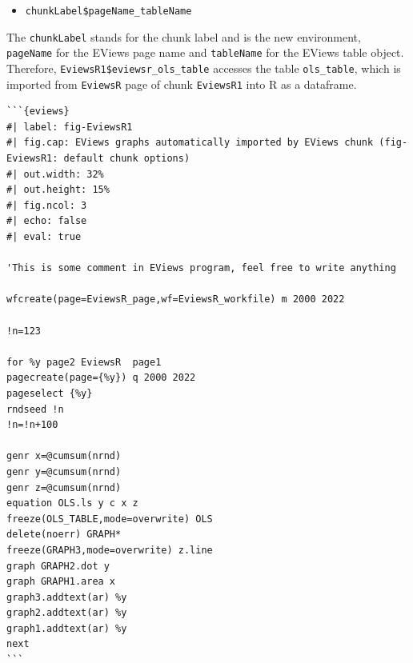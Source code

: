 \begin{itemize}
\tightlist
\item
  \texttt{chunkLabel\$pageName\_tableName}
\end{itemize}

The \texttt{chunkLabel} stands for the chunk label and is the new environment, \texttt{pageName} for the EViews page name and \texttt{tableName} for the EViews table object. Therefore, \texttt{EviewsR1\$eviewsr\_ols\_table} accesses the table \texttt{ols\_table}, which is imported from \texttt{EviewsR} page of chunk \texttt{EviewsR1} into R as a dataframe.

\begin{verbatim}
```{eviews} 
#| label: fig-EviewsR1
#| fig.cap: EViews graphs automatically imported by EViews chunk (fig-EviewsR1: default chunk options)
#| out.width: 32%
#| out.height: 15%
#| fig.ncol: 3
#| echo: false
#| eval: true

'This is some comment in EViews program, feel free to write anything

wfcreate(page=EviewsR_page,wf=EviewsR_workfile) m 2000 2022

!n=123

for %y page2 EviewsR  page1 
pagecreate(page={%y}) q 2000 2022
pageselect {%y}
rndseed !n
!n=!n+100

genr x=@cumsum(nrnd)
genr y=@cumsum(nrnd)
genr z=@cumsum(nrnd)
equation OLS.ls y c x z
freeze(OLS_TABLE,mode=overwrite) OLS
delete(noerr) GRAPH*
freeze(GRAPH3,mode=overwrite) z.line
graph GRAPH2.dot y
graph GRAPH1.area x
graph3.addtext(ar) %y
graph2.addtext(ar) %y
graph1.addtext(ar) %y
next
``` 
\end{verbatim}

